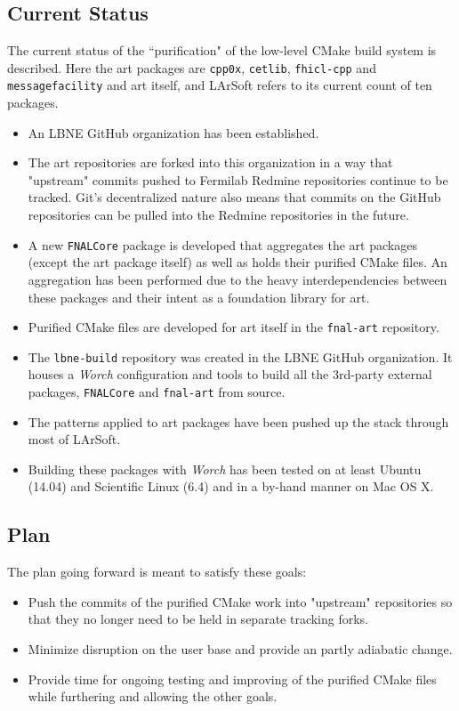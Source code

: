 \documentclass[usletter]{article}
\newcommand{\code}[1]{\texttt{#1}}
\newcommand{\worch}{\textit{Worch}\xspace}
\newcommand{\art}{art\xspace}
\newcommand{\larsoft}{LArSoft\xspace}
\begin{document}
\subsection{Current Status}
The current status of the ``purification" of the low-level CMake build
system is described. Here the \art packages are \code{cpp0x}, \code{cetlib},
\code{fhicl-cpp} and \code{messagefacility} and \art itself, and \larsoft refers to
its current count of ten packages.
\begin{itemize}

	\item An LBNE GitHub organization has been established\cite{lbneghorg}.
	\item The \art repositories are forked into this organization in a way
    that "upstream" commits pushed to Fermilab Redmine repositories
    continue to be tracked. Git's decentralized nature also means that
    commits on the GitHub repositories can be pulled into the Redmine
    repositories in the future.
	\item A new \code{FNALCore} package\cite{fnalcoregh} is developed that aggregates the \art
    packages (except the \art package itself) as well as holds their
    purified CMake files. An aggregation has been performed due to the
    heavy interdependencies between these packages and their intent as
    a foundation library for \art.
	\item Purified CMake files are developed for \art itself in the
    \code{fnal-art} repository\cite{fnalartgh}.
	\item The \code{lbne-build} repository\cite{lbnebuildgh}  was created in the LBNE GitHub
    organization. It houses a \worch configuration and tools to build
    all the 3rd-party external packages, \code{FNALCore} and \code{fnal-art} from
    source.
	\item The patterns applied to \art packages have been pushed up the stack through most of \larsoft.
	\item Building these packages with \worch has been tested on at least
    Ubuntu (14.04) and Scientific Linux (6.4) and in a by-hand manner on
    Mac OS X.
\end{itemize}


\subsection{Plan}

The plan going forward is meant to satisfy these goals:
\begin{itemize}
	\item Push the commits of the purified CMake work into "upstream"
    repositories so that they no longer need to be held in separate
    tracking forks.
	\item Minimize disruption on the user base and provide an partly adiabatic
    change.
	\item Provide time for ongoing testing and improving of the purified CMake
    files while furthering and allowing the other goals.
\end{itemize}
\end{document}
